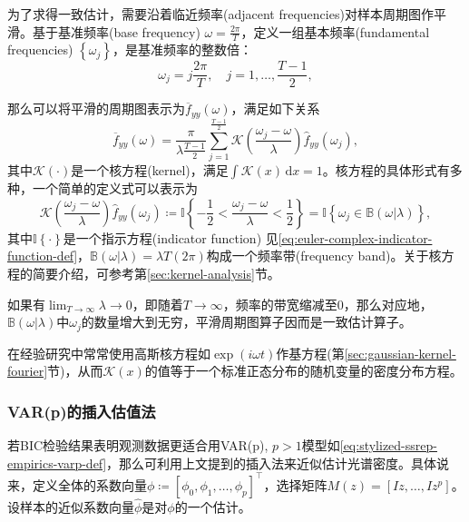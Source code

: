 为了求得一致估计，需要沿着临近频率(adjacent frequencies)对样本周期图作平滑。基于基准频率(base frequency) $\omega = \frac{2 \pi}{T}$，定义一组基本频率(fundamental frequencies) $\left\{ \omega_{j} \right\}$，是基准频率的整数倍：
\begin{equation*}
  \omega_{j} = j \frac{2 \pi}{T}, \quad j = 1, \ldots, \frac{T-1}{2},
\end{equation*}

那么可以将平滑的周期图表示为$\overline{f}_{yy} \left( \omega \right)$，满足如下关系
\begin{equation}
  \label{eq:spectral-periodgram-smooth}
  \overline{f}_{yy} \left( \omega \right)  =
  \frac{\pi}{ \lambda \frac{T-1}{2}} \sum_{j=1}^{\frac{T-1}{2}}
  \mathcal{K} \left( \frac{\omega_{j} - \omega}{\lambda} \right)
  \hat{f}_{yy} \left( \omega_{j} \right),
\end{equation}
其中$\mathcal{K}(\cdot)$是一个核方程(kernel)，满足$\int \mathcal{K}(x) \, \mathrm{d} x = 1$。核方程的具体形式有多种，一个简单的定义式可以表示为
\begin{equation}
  \label{eq:spectral-periodgram-smooth-kernel-def}
  \mathcal{K} \left( \frac{\omega_{j} - \omega}{\lambda} \right)
  \hat{f}_{yy} \left( \omega_{j} \right)
  \coloneqq \mathbb{I}
  \left\{
  - \frac{1}{2} < \frac{\omega_{j} - \omega }{\lambda} < \frac{1}{2}
  \right\}
  = \mathbb{I}
  \left\{
    \omega_{j} \in
    \mathbb{B} \left( \omega | \lambda \right)
  \right\},
\end{equation}
其中$\mathbb{I} \left\{ \cdot \right\}$是一个指示方程(indicator function)
见\eqref{eq:euler-complex-indicator-function-def}，$\mathbb{B} \left( \omega | \lambda \right) = \lambda T \left( 2 \pi \right)$构成一个频率带(frequency band)。关于核方程的简要介绍，可参考第\ref{sec:kernel-analysis}节。

如果有$\lim_{T \rightarrow \infty} \lambda \rightarrow 0$，即随着$T \rightarrow \infty$，频率的带宽缩减至$0$，那么对应地，$\mathbb{B} \left( \omega | \lambda \right)$中$\omega_{j}$的数量增大到无穷，平滑周期图算子因而是一致估计算子。

在经验研究中常常使用高斯核方程如$\exp \left( i \omega t \right)$作基方程(第\ref{sec:gaussian-kernel-fourier}节)，从而$\mathcal{K}(x)$的值等于一个标准正态分布的随机变量的密度分布方程。

\subsubsection{VAR(p)的插入估值法}
\label{sec:stylized-ssrep-empirics-spectral-indirect}
若BIC检验结果表明观测数据更适合用VAR(p), $p >1$模型如\eqref{eq:stylized-ssrep-empirics-varp-def}，那么可利用上文提到的插入法来近似估计光谱密度。具体说来，定义全体的系数向量$\phi \coloneqq \left[ \phi_{0}, \phi_{1}, \ldots, \phi_{p} \right]^{\top}$，选择矩阵$M(z) = \left[ Iz, \ldots, Iz^{p}\right]$。设样本的近似系数向量$\hat{\phi}$是对$\phi$的一个估计。


